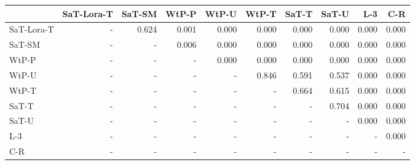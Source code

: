 \begin{tabular}{lrrrrrrrrr}
\toprule
 & SaT-Lora-T & SaT-SM & WtP-P & WtP-U & WtP-T & SaT-T & SaT-U & L-3 & C-R \\
\midrule
SaT-Lora-T & - & 0.624 & 0.001 & 0.000 & 0.000 & 0.000 & 0.000 & 0.000 & 0.000 \\
SaT-SM & - & - & 0.006 & 0.000 & 0.000 & 0.000 & 0.000 & 0.000 & 0.000 \\
WtP-P & - & - & - & 0.000 & 0.000 & 0.000 & 0.000 & 0.000 & 0.000 \\
WtP-U & - & - & - & - & 0.846 & 0.591 & 0.537 & 0.000 & 0.000 \\
WtP-T & - & - & - & - & - & 0.664 & 0.615 & 0.000 & 0.000 \\
SaT-T & - & - & - & - & - & - & 0.704 & 0.000 & 0.000 \\
SaT-U & - & - & - & - & - & - & - & 0.000 & 0.000 \\
L-3 & - & - & - & - & - & - & - & - & 0.000 \\
C-R & - & - & - & - & - & - & - & - & - \\
\bottomrule
\end{tabular}

